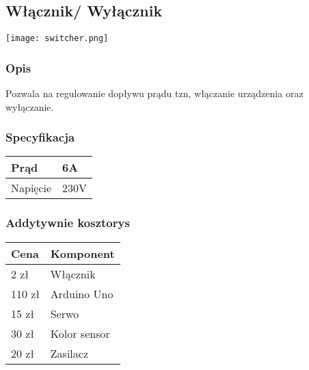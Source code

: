 \documentclass[12pt]{article}
\begin{document}
\subsection{Włącznik/ Wyłącznik}
\begin{center}
\begin{minipage}[H]{.65\textwidth}
    \texttt{[image: switcher.png]}
\end{minipage}
\end{center}
\subsubsection{Opis}
Pozwala na regulowanie dopływu prądu tzn, włączanie urządzenia oraz wyłączanie.
\subsubsection{Specyfikacja}
\begin{center}
\begin{tabular}{ | m{5cm} | m{3cm} | } 
\hline
Prąd& 6A \\
\hline
Napięcie& 230V\\
\hline
\end{tabular}
\end{center}
\subsubsection{Addytywnie kosztorys}
\begin{center}
\begin{tabular}{ | m{5cm} | m{3cm} | } 
\hline
Cena &  Komponent  \\
\hline
 2 zł & Włącznik \\
\hline
110 zł & Arduino Uno \\
\hline
15 zł & Serwo \\
\hline
30 zł & Kolor sensor \\
\hline
20 zł & Zasilacz\\
\hline


\end{tabular}
\end{center}
\end{document}
